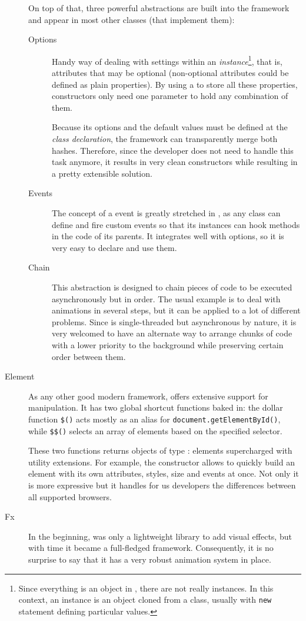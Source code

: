 \begin{description}
  On top of that, three powerful abstractions are built into the framework and appear in most other classes (that implement them):
  \begin{description}
    \item[Options] Handy way of dealing with settings within an \emph{instance}\footnote{Since everything is an object in , there are not really instances. In this context, an instance is an object cloned from a  class, usually with \texttt{new} statement defining particular values.}, that is, attributes that may be optional (non-optional attributes could be defined as plain properties).
    By using a  to store all these properties, constructors only need one parameter to hold any combination of them.
    
    Because its options and the default values must be defined at the \emph{class declaration}, the framework can transparently merge both hashes.
    Therefore, since the developer does not need to handle this task anymore, it results in very clean constructors while resulting in a pretty extensible solution.
    \item[Events] The concept of a event is greatly stretched in , as any class can define and fire custom events so that its instances can hook methods in the code of its parents.
    It integrates well with  options, so it is very easy to declare and use them.
    \item[Chain] This abstraction is designed to chain pieces of code to be executed asynchronously but in order.
    The usual example is to deal with animations in several steps, but it can be applied to a lot of different problems.
    Since  is single-threaded but asynchronous by nature, it is very welcomed to have an alternate way to arrange chunks of code with a lower priority to the background while preserving certain order between them.
  \end{description}
  \item[Element] As any other good modern framework,  offers extensive support for  manipulation.
  It has two global shortcut functions baked in: the dollar function \texttt{\$()} acts mostly as an alias for \texttt{document.getElementById()}, while \texttt{\$\$()} selects an array of  elements based on the specified  selector.
  
  These two functions returns objects of type :  elements supercharged with utility extensions.
  For example, the constructor allows to quickly build an element with its own attributes, styles, size and events at once.
  Not only it is more expressive but it handles for us developers the differences between all supported browsers.
  \item[Fx] In the beginning,  was only a lightweight library to add visual effects, but with time it became a full-fledged framework.
  Consequently, it is no surprise to say that it has a very robust animation system in place.
  

\end{description}
